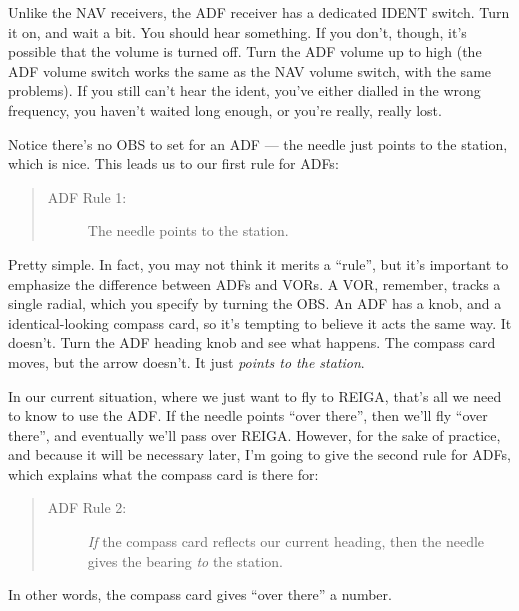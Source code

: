 Unlike the NAV receivers, the ADF receiver has a dedicated IDENT
switch.  Turn it on, and wait a bit.  You should hear something.  If
you don't, though, it's possible that the volume is turned off.  Turn
the ADF volume up to high (the ADF volume switch works the same as the
NAV volume switch, with the same problems).  If you still can't hear
the ident, you've either dialled in the wrong frequency, you haven't
waited long enough, or you're really, really lost.

Notice there's no OBS to set for an ADF --- the needle just points to
the station, which is nice.  This leads us to our first rule for ADFs:

\begin{quote}
  \begin{description}
  \item[ADF Rule 1:] The needle points to the station.
  \end{description}
\end{quote}

Pretty simple.  In fact, you may not think it merits a ``rule'', but
it's important to emphasize the difference between ADFs and VORs.  A
VOR, remember, tracks a single radial, which you specify by turning
the OBS.  An ADF has a knob, and a identical-looking compass card, so
it's tempting to believe it acts the same way.  It doesn't.  Turn the
ADF heading knob and see what happens.  The compass card moves, but
the arrow doesn't.  It just \emph{points to the station}.

In our current situation, where we just want to fly to REIGA, that's
all we need to know to use the ADF.  If the needle points ``over
there'', then we'll fly ``over there'', and eventually we'll pass over
REIGA.  However, for the sake of practice, and because it will be
necessary later, I'm going to give the second rule for ADFs, which
explains what the compass card is there for:

\begin{quote}
  \begin{description}
  \item[ADF Rule 2:] \emph{If} the compass card reflects our current
    heading, then the needle gives the bearing \emph{to} the station.
  \end{description}
\end{quote}

In other words, the compass card gives ``over there'' a number.


